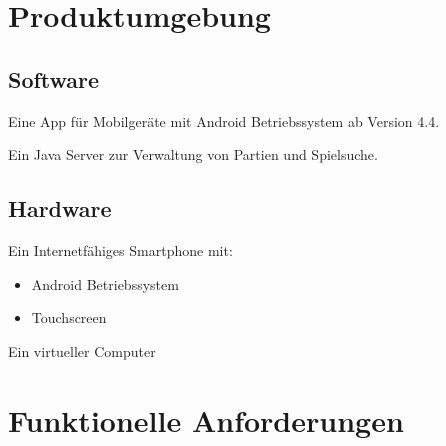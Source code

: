 \documentclass[parskip=full]{scrartcl}
\begin{document}
\section{Produktumgebung}
	\subsection{Software}
		\begin{description}
			\item Eine App für Mobilgeräte mit \gls{Android} Betriebssystem ab Version 4.4.
			\item Ein Java Server zur Verwaltung von Partien und Spielsuche.		
		\end{description}
	\subsection{Hardware}
		\begin{description}			
			\item Ein Internetfähiges \gls{Smartphone} mit:
			\begin{itemize}
			\item \gls{Android} Betriebssystem
			\item Touchscreen
			\end{itemize}
		\item Ein virtueller Computer
		\end{description}
\pagebreak		  
\section{Funktionelle Anforderungen}
\end{document}
